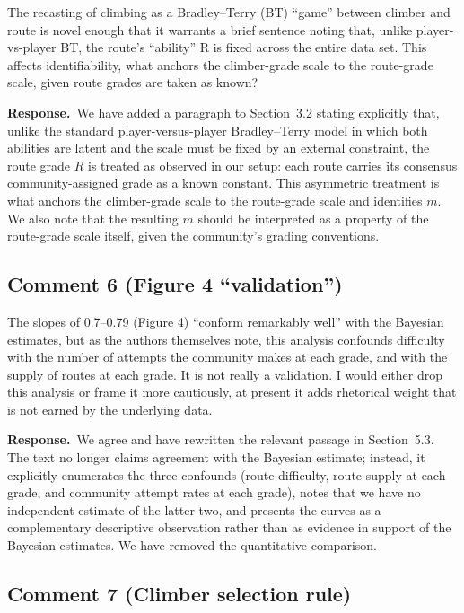 \documentclass[11pt]{article}
\newenvironment{review}{\begingroup\color{revcolor}\itshape\par\noindent}{\par\endgroup}
\newcommand{\response}{\par\noindent\textbf{Response.}\ }
\begin{document}
\begin{review}
The recasting of climbing as a Bradley--Terry (BT) ``game'' between climber and route is novel enough that it warrants a brief sentence noting that, unlike player-vs-player BT, the route's ``ability'' R is fixed across the entire data set. This affects identifiability, what anchors the climber-grade scale to the route-grade scale, given route grades are taken as known?
\end{review}
\response We have added a paragraph to Section~3.2 stating explicitly that, unlike the standard player-versus-player Bradley--Terry model in which both abilities are latent and the scale must be fixed by an external constraint, the route grade $R$ is treated as observed in our setup: each route carries its consensus community-assigned grade as a known constant. This asymmetric treatment is what anchors the climber-grade scale to the route-grade scale and identifies $m$. We also note that the resulting $m$ should be interpreted as a property of the route-grade scale itself, given the community's grading conventions.

\subsection*{Comment 6 (Figure 4 ``validation'')}

\begin{review}
The slopes of 0.7--0.79 (Figure 4) ``conform remarkably well'' with the Bayesian estimates, but as the authors themselves note, this analysis confounds difficulty with the number of attempts the community makes at each grade, and with the supply of routes at each grade. It is not really a validation. I would either drop this analysis or frame it more cautiously, at present it adds rhetorical weight that is not earned by the underlying data.
\end{review}
\response We agree and have rewritten the relevant passage in Section~5.3. The text no longer claims agreement with the Bayesian estimate; instead, it explicitly enumerates the three confounds (route difficulty, route supply at each grade, and community attempt rates at each grade), notes that we have no independent estimate of the latter two, and presents the curves as a complementary descriptive observation rather than as evidence in support of the Bayesian estimates. We have removed the quantitative comparison.

\subsection*{Comment 7 (Climber selection rule)}
\end{document}
